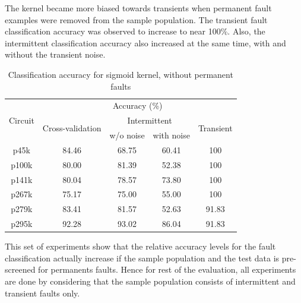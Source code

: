 The kernel became more biased towards transients when permanent fault examples were removed from the sample population. The transient fault classification accuracy was observed to increase to near 100\%. Also, the intermittent classification accuracy also increased at the same time, with and without the transient noise.

\begin{table}[h]
\captionsetup{justification=centering}
\begin{tabular}{ccccc}
\hline
\multirow{3}{*}{Circuit} & \multicolumn{4}{c}{Accuracy (\%)}                                                                 \\ \cline{2-5} 
                         & \multirow{2}{*}{Cross-validation} & \multicolumn{2}{c}{Intermittent} & \multirow{2}{*}{Transient} \\ \cline{3-4}
                         &                                   & w/o noise      & with noise      &                            \\ \hline
p45k                     & 84.46                             & 68.75          & 60.41           & 100                        \\
p100k                    & 80.00                             & 81.39          & 52.38           & 100                        \\
p141k                    & 80.04                             & 78.57          & 73.80           & 100                        \\
p267k                    & 75.17                             & 75.00          & 55.00           & 100                        \\
p279k                    & 83.41                             & 81.57          & 52.63           & 91.83                      \\
p295k                    & 92.28                             & 93.02          & 86.04           & 91.83                     \\
\hline
\end{tabular}
\caption {Classification accuracy for sigmoid kernel, without permanent faults}
\label{tab:sigwop}
\end{table}

This set of experiments show that the relative accuracy levels for the fault classification actually increase if the sample population and the test data is pre-screened for permanents faults. Hence for rest of the evaluation,  all experiments are done by considering that the sample population consists of intermittent and transient faults only.

